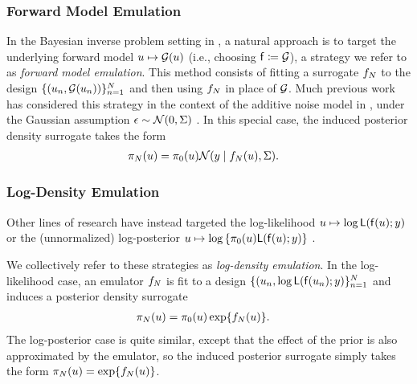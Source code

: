 \documentclass[12pt]{article}
\begin{document}
\subsubsection{Forward Model Emulation}
In the Bayesian inverse problem setting in ,
a natural approach is to target the underlying forward model 
$u \mapsto \mathcal{G}(u)$ (i.e., choosing $\mathsf{f} \coloneqq \mathcal{G}$), a strategy 
we refer to as \textit{forward model emulation}.
This method consists of fitting a surrogate $f_{N}$ to the design 
$\{(u_n, \mathcal{G}(u_n))\}_{n=1}^{N}$ and then using $f_{N}$
in place of $\mathcal{G}$. Much previous work has considered this strategy 
in the context of the additive noise model in ,
under the Gaussian assumption $\epsilon \sim \mathcal{N}(0, \Sigma)$
\citep{StuartTeck1,GP_PDE_priors,hydrologicalModel,hydrologicalModel2,
Surer2023sequential,VillaniAdaptiveGP,weightedIVAR,idealizedGCM,CES}.
In this special case, the induced posterior density surrogate takes the form
\begin{align}
\pi_{N}(u) &= \pi_0(u) \mathcal{N}(y \mid f_{N}(u), \Sigma). \label{eq:post-em-fwd-Gaussian}
\end{align}

\subsubsection{Log-Density Emulation}
Other lines of research have instead targeted the log-likelihood $u \mapsto \log \mathsf{L}(\mathsf{f}(u); y)$
\citep{VehtariParallelGP,FATES_CES,trainDynamics,quantileApprox,
ActiveLearningMCMC,FerEmulation,StuartTeck1,random_fwd_models,
GP_PDE_priors,OakleyllikEm,JosephMinEnergy,AlawiehIterativeGP}
or the (unnormalized) log-posterior 
$u \mapsto \log \left\{\pi_0(u)\mathsf{L}(\mathsf{f}(u); y)\right\}$
\citep{emPostDens,Kandasamy_2017,llikRBF,gp_surrogates_random_exploration,
landslideCalibration}.

We collectively refer to these strategies as \textit{log-density emulation}. In the 
log-likelihood case, an emulator $f_{N}$ is fit to a design 
$\{(u_n, \log \mathsf{L}(\mathsf{f}(u_n); y)\}_{n=1}^{N}$
and induces a posterior density surrogate 
\begin{align}
\pi_{N}(u) &= \pi_0(u) \exp\mathopen{}\left\{f_{N}(u)\right\}\mathclose{}. \label{eq:post-em-llik}
\end{align}
The log-posterior case is quite similar, except that the effect of the prior is also 
approximated by the emulator, so the induced posterior surrogate simply takes 
the form $\pi_{N}(u) = \exp\mathopen{}\left\{f_{N}(u)\right\}\mathclose{}$.
\end{document}
